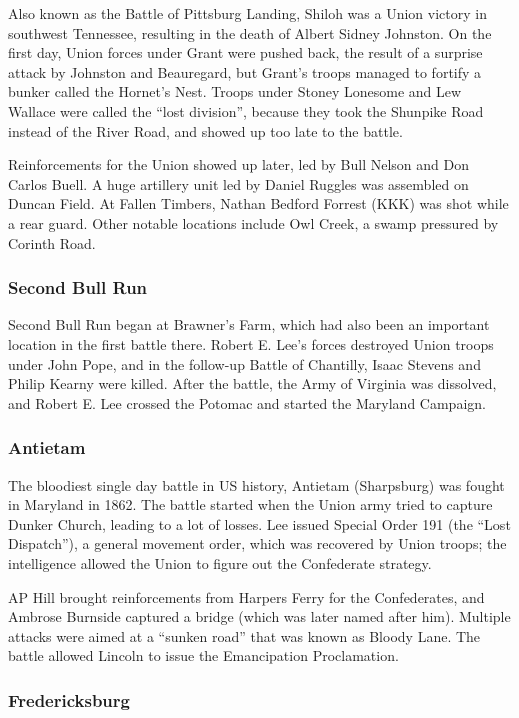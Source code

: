 Also known as the Battle of Pittsburg Landing, Shiloh was a Union victory in southwest Tennessee,
resulting in the death of Albert Sidney Johnston.
On the first day, Union forces under Grant were pushed back,
the result of a surprise attack by Johnston and Beauregard,
but Grant's troops managed to fortify a bunker called the Hornet's Nest.
Troops under Stoney Lonesome and Lew Wallace were called the ``lost division'',
because they took the Shunpike Road instead of the River Road,
and showed up too late to the battle.

Reinforcements for the Union showed up later, led by Bull Nelson and Don Carlos Buell.
A huge artillery unit led by Daniel Ruggles was assembled on Duncan Field.
At Fallen Timbers, Nathan Bedford Forrest (KKK) was shot while a rear guard.
Other notable locations include Owl Creek, a swamp pressured by Corinth Road.

\subsubsection*{Second Bull Run}

Second Bull Run began at Brawner's Farm, which had also been an important location in the first battle there.
Robert E. Lee's forces destroyed Union troops under John Pope,
and in the follow-up Battle of Chantilly, Isaac Stevens and Philip Kearny were killed.
After the battle, the Army of Virginia was dissolved,
and Robert E. Lee crossed the Potomac and started the Maryland Campaign.

\subsubsection*{Antietam}

The bloodiest single day battle in US history, Antietam (Sharpsburg) was fought in Maryland in 1862.
The battle started when the Union army tried to capture Dunker Church, leading to a lot of losses.
Lee issued Special Order 191 (the ``Lost Dispatch''),
a general movement order, which was recovered by Union troops;
the intelligence allowed the Union to figure out the Confederate strategy.

AP Hill brought reinforcements from Harpers Ferry for the Confederates,
and Ambrose Burnside captured a bridge (which was later named after him).
Multiple attacks were aimed at a ``sunken road'' that was known as Bloody Lane.
The battle allowed Lincoln to issue the Emancipation Proclamation.

\subsubsection*{Fredericksburg}

